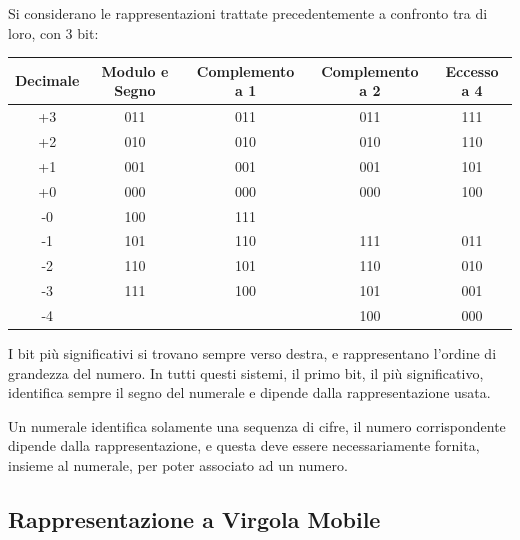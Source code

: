 \documentclass{article}
\numberwithin{equation}{subsection}
\begin{document}
Si considerano le rappresentazioni trattate precedentemente a confronto tra di loro, con 3 bit: 
\begin{center}
    \begin{tabular}{|c||c|c|c|c|}
        \hline
        Decimale & Modulo e Segno & Complemento a 1 & Complemento a 2 & Eccesso a 4\\
        \hline\hline
        +3 & 011 & 011 & 011 & 111 \\
        \hline
        +2 & 010 & 010 & 010 & 110 \\
        \hline
        +1 & 001 & 001 & 001 & 101 \\
        \hline
        +0 & 000 & 000 & 000 & 100 \\
        \hline
        -0 & 100 & 111 & & \\
        \hline
        -1 & 101 & 110 & 111 & 011 \\
        \hline 
        -2 & 110 & 101 & 110 & 010 \\
        \hline
        -3 & 111 & 100 & 101 & 001 \\
        \hline
        -4 & & & 100 & 000 \\
        \hline
    \end{tabular}
\end{center}
I bit più significativi si trovano sempre verso destra, e rappresentano l'ordine di grandezza del numero. In tutti questi sistemi, 
il primo bit, il più significativo, identifica sempre il segno del numerale e dipende dalla rappresentazione usata. 


Un numerale identifica solamente una sequenza di cifre, il numero corrispondente dipende dalla rappresentazione, e questa deve essere necessariamente fornita, insieme al numerale, per poter associato ad un numero. 

\subsection{Rappresentazione a Virgola Mobile}
\end{document}
